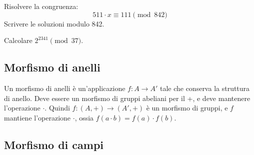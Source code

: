 \begin{esercizio}
Risolvere la congruenza:
\[
511 \cdot x \equiv 111 \pmod{842}
\]
Scrivere le soluzioni modulo 842.
\end{esercizio}

\begin{esercizio}
Calcolare $2^{2341} \pmod{37}$.
\end{esercizio}


\subsection{Morfismo di anelli}

Un morfismo di anelli \`e un'applicazione $f : A \to A'$ tale che conserva la struttura di anello. Deve essere un morfismo di gruppi abeliani per il +, e deve mantenere l'operazione $\cdot$. Quindi $f : (A, +) \to (A', +)$ \`e un morfismo di gruppi, e $f$ mantiene l'operazione $\cdot$, ossia $f(a \cdot b) = f(a) \cdot f(b)$.

\subsection{Morfismo di campi}


